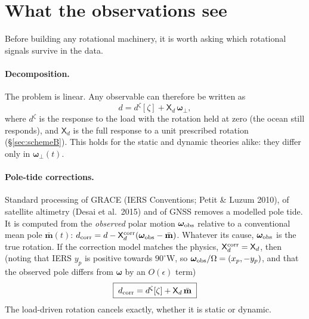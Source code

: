 \documentclass[11pt,a4paper]{article}
\newcommand{\bw}{\bm{\omega}}
\begin{document}
\section{What the observations see}
\label{sec:data}

Before building any rotational machinery, it is worth asking which rotational signals survive in the
data.

\paragraph{Decomposition.} The problem is linear. Any observable can therefore be written as
\begin{equation}
  d=d^\zeta[\zeta]+\mathsf{X}_d\,\bw_\perp,
  \label{eq:dsplit}
\end{equation}
where $d^\zeta$ is the response to the load with the rotation held at zero (the ocean still
responds), and $\mathsf{X}_d$ is the full response to a unit prescribed rotation (\S\ref{sec:schemeB}).
This holds for the static and dynamic theories alike: they differ only in $\bw_\perp(t)$.

\paragraph{Pole-tide corrections.} Standard processing of GRACE (IERS Conventions; Petit \& Luzum 2010),
of satellite altimetry (Desai et al.\ 2015) and of GNSS removes a modelled pole tide. It is computed
from the \emph{observed} polar motion $\bw_{\rm obs}$ relative to a conventional mean pole
$\bar{\mathbf m}(t)$:
$d_{\rm corr}=d-\mathsf{X}^{\rm corr}_d(\bw_{\rm obs}-\bar{\mathbf m})$. Whatever its cause,
$\bw_{\rm obs}$ is the true rotation. If the correction model matches the physics,
$\mathsf{X}^{\rm corr}_d=\mathsf{X}_d$, then (noting that IERS $y_p$ is positive towards $90^\circ$W, so
$\bw_{\rm obs}/\Omega=(x_p,-y_p)$, and that the observed pole differs from $\bw$ by an $O(\epsilon)$
term)
\begin{equation}
  \boxed{\;d_{\rm corr}=d^\zeta[\zeta]+\mathsf{X}_d\,\bar{\mathbf m}\;}
  \label{eq:dcorr}
\end{equation}
The load-driven rotation cancels exactly, whether it is static or dynamic.
\end{document}
